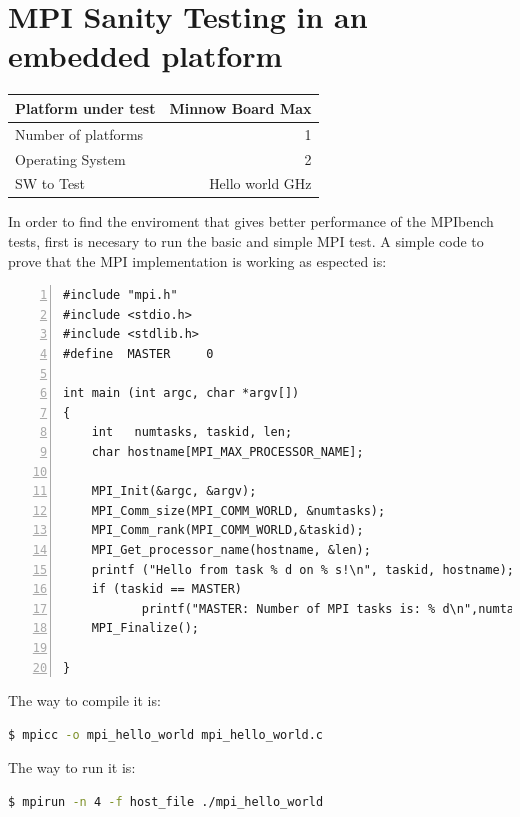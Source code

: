 \section{MPI Sanity Testing in an embedded platform}


    \begin{center}
    \begin{tabular}{ | l | r |}
        \hline
        Platform under test & Minnow Board  Max \\ \hline
        Number of platforms  & 1  \\ \hline
        Operating System & 2  \\ \hline
        SW to Test & Hello world GHz  \\ \hline
    \end{tabular}
    \end{center}


In order to find the enviroment that gives better performance of the MPIbench
tests, first is necesary to run the basic and simple MPI test. A simple code to
prove that the MPI implementation is working as espected is:

\begin{lstlisting}[frame=single,numbers=left,breaklines=true,basicstyle=\tiny]
#include "mpi.h"
#include <stdio.h>
#include <stdlib.h>
#define  MASTER     0

int main (int argc, char *argv[])
{
    int   numtasks, taskid, len;
    char hostname[MPI_MAX_PROCESSOR_NAME];

    MPI_Init(&argc, &argv);
    MPI_Comm_size(MPI_COMM_WORLD, &numtasks);
    MPI_Comm_rank(MPI_COMM_WORLD,&taskid);
    MPI_Get_processor_name(hostname, &len);
    printf ("Hello from task % d on % s!\n", taskid, hostname);
    if (taskid == MASTER)
           printf("MASTER: Number of MPI tasks is: % d\n",numtasks);
    MPI_Finalize();

}
\end{lstlisting}

The way to compile it is: 

\begin{lstlisting}[frame=single,language=bash]
  $ mpicc -o mpi_hello_world mpi_hello_world.c
\end{lstlisting}


The way to run it is: 

\begin{lstlisting}[frame=single,language=bash]
  $ mpirun -n 4 -f host_file ./mpi_hello_world
\end{lstlisting}

